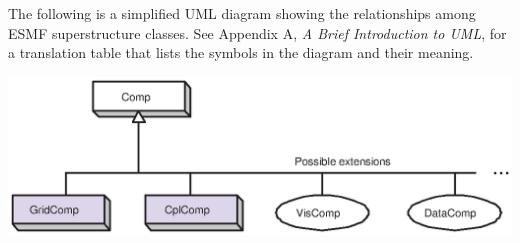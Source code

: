 The following is a simplified UML diagram showing the relationships among
ESMF superstructure classes.  See Appendix A, {\it A Brief Introduction 
to UML}, for a translation table that lists the symbols in the diagram 
and their meaning.

\begin{center}
\includegraphics{Comp_obj.eps}   
\end{center}



